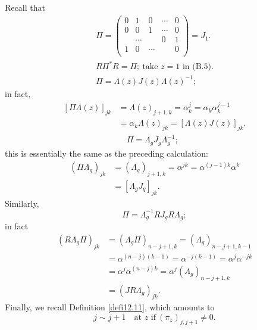 \documentclass{surv-l}
\theoremstyle{plain}
\theoremstyle{definition}
\numberwithin{equation}{chapter}
\begin{document}
{Recall that
\begin{align}\label{eqb.13}
\Pi=\left(
      \begin{array}{ccccc}
        0 & 1 & 0 & \cdots & 0 \\
        0 & 0 & 1 & \cdots & 0 \\
          & \cdots &  & 0 & 1 \\
        1 & 0 & \cdots &  & 0 \\
      \end{array}
    \right) = J_{1}.\nonumber\\
R\Pi^{*}R=\Pi;\ \text{take $z=1$ in (B.5)}.\\
\Pi=\Lambda(z)J(z)\Lambda(z)^{-1};
\end{align}
in fact,
\begin{align}\label{eqB.15}
[\Pi\Lambda(z)]_{jk} & = \Lambda(z)_{j+1,k} = \alpha_{k}^{j} = \alpha_{k}\alpha_{k}^{j-1}\nonumber\\
& = \alpha_{k}\Lambda(z)_{j k}=[\Lambda(z)J(z)]_{j k}.\nonumber\\
&\quad \Pi=\Lambda_{g}J_{g}\Lambda_{g}^{-1};
\end{align}
this is essentially the same as the preceding calculation:
\begin{align*}
(\Pi\Lambda_{g})_{jk} & = (\Lambda_{g})_{j+1,k}=\alpha^{j k}=\alpha^{(j-1)k}\alpha^{k}\\
& = [\Lambda_{g}J_{q}]_{j k}.
\end{align*}
Similarly,
\begin{equation}\label{eqB.16}
\Pi=\Lambda_{g}^{-1}RJ_{g}R\Lambda_{g};
\end{equation}
in fact
\begin{align*}
(R\Lambda_{g}\Pi)_{jk} & =(\Lambda_{g}\Pi)_{n-j+1,k}=(\Lambda_{g})_{n-j+1,k-1}\\
& = \alpha^{(n-j)(k-1)} = \alpha^{-j(k-1)}=\alpha^{j}\alpha^{-j k}\\
& =\alpha^{j}\alpha^{(n-j)k} = \alpha^{j}(\Lambda_{g})_{n-j+1,k}\\
& =(JR\Lambda_{g})_{jk}.
\end{align*}
Finally, we recall Definition \ref{defi12.11}, which amounts to
\begin{equation}\label{eqB.17}
j \sim j+1\quad \text{at $z$ if}\ (\pi_{z})_{j,j+1}\neq 0.
\end{equation}
}
\end{document}

